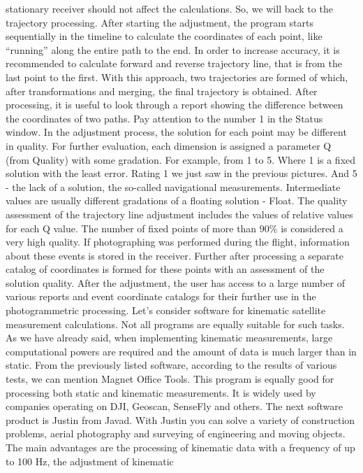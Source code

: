 \documentclass[
  letterpaper,
  DIV=11,
  numbers=noendperiod]{scrreprt}
\begin{document}
stationary receiver should not affect the calculations. So, we will back
to the trajectory processing. After starting the adjustment, the program
starts sequentially in the timeline to calculate the coordinates of each
point, like ``running'' along the entire path to the end. In order to
increase accuracy, it is recommended to calculate forward and reverse
trajectory line, that is from the last point to the first. With this
approach, two trajectories are formed of which, after transformations
and merging, the final trajectory is obtained. After processing, it is
useful to look through a report showing the difference between the
coordinates of two paths. Pay attention to the number 1 in the Status
window. In the adjustment process, the solution for each point may be
different in quality. For further evaluation, each dimension is assigned
a parameter Q (from Quality) with some gradation. For example, from 1 to
5. Where 1 is a fixed solution with the least error. Rating 1 we just
saw in the previous pictures. And 5 - the lack of a solution, the
so-called navigational measurements. Intermediate values are usually
different gradations of a floating solution - Float. The quality
assessment of the trajectory line adjustment includes the values of
relative values for each Q value. The number of fixed points of more
than 90\% is considered a very high quality. If photographing was
performed during the flight, information about these events is stored in
the receiver. Further after processing a separate catalog of coordinates
is formed for these points with an assessment of the solution quality.
After the adjustment, the user has access to a large number of various
reports and event coordinate catalogs for their further use in the
photogrammetric processing. Let's consider software for kinematic
satellite measurement calculations. Not all programs are equally
suitable for such tasks. As we have already said, when implementing
kinematic measurements, large computational powers are required and the
amount of data is much larger than in static. From the previously listed
software, according to the results of various tests, we can mention
Magnet Office Tools. This program is equally good for processing both
static and kinematic measurements. It is widely used by companies
operating on DJI, Geoscan, SenseFly and others. The next software
product is Justin from Javad. With Justin you can solve a variety of
construction problems, aerial photography and surveying of engineering
and moving objects. The main advantages are the processing of kinematic
data with a frequency of up to 100 Hz, the adjustment of kinematic
\end{document}

